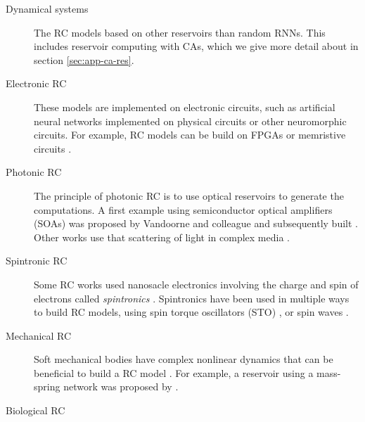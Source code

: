 \begin{description}
  \item[Dynamical systems] The \ac{RC} models based on other reservoirs than
        random \acp{RNN}. This includes reservoir computing with \aclp{CA},
        which we give more detail about in section \ref{sec:app-ca-res}.
  \item[Electronic \ac{RC}] These models are implemented on electronic circuits,
        such as artificial neural networks implemented on physical circuits or
        other neuromorphic circuits. For example, \ac{RC} models can be build on
        FPGAs \parencite{antonikApplicationFPGAReal2018,
        verstraetenReservoirComputingStochastic2005,
        alomarLowcostHardwareImplementation2014,
        antonikFPGAImplementationReservoir2015} or memristive circuits
        \parencite{yangInvestigationsStaircaseMemristor2016,
        merkelMemristiveReservoirComputing2014,
        donahueDesignAnalysisNeuromemristive2015}.
  \item[Photonic \ac{RC}] The principle of photonic \ac{RC} is to use optical
        reservoirs to generate the computations. A first example using
        semiconductor optical amplifiers (SOAs) was proposed by
        Vandoorne and colleague \parencite{vandoorneOpticalSignalProcessing2008,
        vandoorneParallelReservoirComputing2011} and subsequently built \parencite{vandoorneExperimentalDemonstrationReservoir2014}.
        Other works use that scattering of light in complex media
        \parencite{dongOpticalReservoirComputing2020,
        rafayelyanLargeScaleOpticalReservoir2020}.
  \item[Spintronic \ac{RC}] Some \ac{RC} works used nanosacle electronics
        involving the charge and spin of electrons called \emph{spintronics}
        \parencite{wolfSpintronicsSpinBasedElectronics2001}. Spintronics have
        been used in multiple ways to build \ac{RC} models, using spin torque
        oscillators (STO)
        \parencite{torrejonNeuromorphicComputingNanoscale2017,
        williameChaoticDynamicsMacrospin2019}, or spin waves
        \parencite{nakaneReservoirComputingSpin2018}.
  \item[Mechanical \ac{RC}] Soft mechanical bodies have complex nonlinear
        dynamics that can be beneficial to build a \ac{RC} model
        \parencite{pfeiferHowBodyShapes2007}. For example, a reservoir using a
        mass-spring network was proposed by
        \textcite{hauserTheoreticalFoundationMorphological2011}.
  \item[Biological \ac{RC}]
\end{description}


